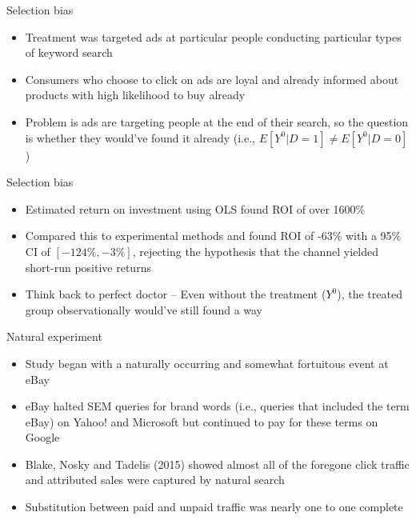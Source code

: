 \documentclass{beamer}
\begin{document}
\begin{frame}{Selection bias}

\begin{itemize}
\item Treatment was targeted ads at particular people conducting particular types of keyword search
\item Consumers who choose to click on ads are loyal and already informed about products with high likelihood to buy already 
\item Problem is ads are targeting people at the end of their search, so the question is whether they would've found it already (i.e., $E[Y^0|D=1] \neq E[Y^0|D=0]$)
\end{itemize}


\end{frame}



\begin{frame}{Selection bias}

\begin{itemize}
\item Estimated return on investment using OLS  found ROI of over 1600\%
\item Compared this to experimental methods and found ROI of -63\% with a 95\% CI of $[-124\%, -3\%]$, rejecting the hypothesis that the channel yielded short-run positive returns
\item Think back to perfect doctor -- Even without the treatment ($Y^0$), the treated group observationally would've still found a way
\end{itemize}

\end{frame}

\begin{frame}{Natural experiment}

\begin{itemize}
\item Study began with a naturally occurring and somewhat fortuitous  event at eBay
\item eBay halted SEM queries for brand words (i.e., queries that included the term eBay) on Yahoo! and Microsoft but continued to pay for these terms on Google
\item Blake, Nosky and Tadelis (2015) showed almost all of the foregone click traffic and attributed sales were captured by natural search
\item Substitution between paid and unpaid traffic was nearly one to one complete
\end{itemize}

\end{frame}
\end{document}
